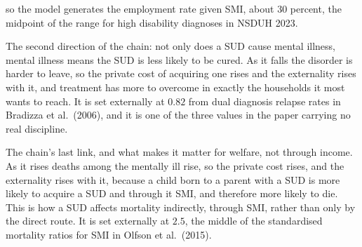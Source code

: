 \documentclass[10pt]{article}
\begin{document}
\begin{description}
so the model generates the employment rate given SMI, about $30$ percent, the
midpoint of the range for high disability diagnoses in NSDUH 2023.
\item[$\mu_m$, the SUD recovery multiplier for SMI.] The second direction of the
chain: not only does a SUD cause mental illness, mental illness means the
SUD is less likely to be cured.
As it falls the disorder is harder to leave, so the private cost of
acquiring one rises and the externality rises with it, and
treatment has more to overcome in exactly the households it most wants to reach. It
is set externally at $0.82$ from dual diagnosis relapse rates in Bradizza et al.\
(2006), and it is one of the three values in the paper carrying no real discipline.
\item[$\kappa_{\phi m}$, the mortality multiplier for SMI.] The chain's last link,
and what makes it matter for welfare, not through income. As it
rises deaths among the mentally ill rise, so the private cost rises, and the
externality rises with it, because a child born to a parent with a SUD is
more likely to acquire a SUD and through it SMI, and therefore more likely to die.
This is how a SUD affects mortality indirectly, through SMI, rather
than only by the direct route. It is set
externally at $2.5$, the middle of the standardised mortality ratios for SMI in
Olfson et al.\ (2015).
\end{description}
\end{document}
